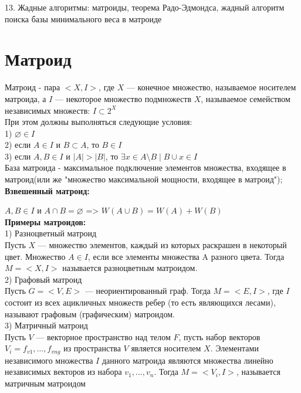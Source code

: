 \documentclass[a4paper,12pt]{article}
\author{Зарина}
\date{декабрь 2019}
\begin{document}
13. Жадные алгоритмы: матроиды, теорема Радо-Эдмондса, жадный алгоритм поиска базы минимального веса в матроиде
\section{Матроид} 
Матроид - пара $<X,I>$, где $X$  — конечное множество, называемое носителем матроида, а $I$ — некоторое множество подмножеств $X$, называемое семейством независимых множеств: $I \subset 2^X$\\

При этом должны выполняться следующие условия:\\
1) $\varnothing \in I$\\
2) если $A \in I$ и $B \subset A$, то $B \in I$\\
3) если $A,B \in I$ и $|A|>|B|$, то $ \exists x \in A \setminus B \mid B\cup x \in I$\\

База матроида - максимальное подключение элементов множества, входящее в матроид(или же "множество максимальной мощности, входящее в матроид");\\


\textbf{Взвешенный матроид:}

$A,B \in I$ и $A\cap B= \varnothing $ => $W(A\cup B)=W(A)+W(B)$\\

\textbf{Примеры матроидов:}\\

1)	Разноцветный матроид\\
Пусть $X$ — множество элементов, каждый из которых раскрашен в некоторый цвет. Множество $A \in I$, если все элементы множества A разного цвета. Тогда $M=<X,I>$ называется разноцветным матроидом.\\

2)	Графовый матроид\\
Пусть $G=<V,E>$ — неориентированный граф. Тогда $M=<E,I>$, где $I$ состоит из всех ацикличных множеств ребер (то есть являющихся лесами), называют графовым (графическим) матроидом.\\

3)	Матричный матроид\\
Пусть $V$ — векторное пространство над телом $F$, пусть набор векторов $V_{i}=f_{v1}, …, f_{vng}$ из пространства $V$ является носителем $X$. Элементами независимого множества $I$ данного матроида являются множества линейно независимых векторов из набора $v_{1},..., v_{n}$. Тогда $M=<V_{i},I>$, называется матричным матроидом\\
\end{document}
